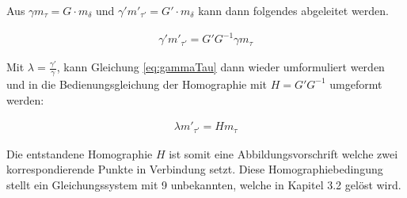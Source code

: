 Aus $\gamma m_\tau = G\cdot m_\delta$ und $\gamma' m'_{\tau'} = G'\cdot m_{\delta}$ kann dann folgendes abgeleitet werden\cite{Elements}.

\begin{gather}
	\gamma' m'_{\tau'} = G' G^{-1} \gamma m_\tau \label{eq:gammaTau}
\end{gather}

Mit $\lambda= \frac{\gamma'}{\gamma}$, kann Gleichung \ref{eq:gammaTau} dann wieder umformuliert werden und in die Bedienungsgleichung der Homographie mit $H=G' G^{-1}$ umgeformt werden:

\begin{gather}
	\lambda m'_{\tau'} = H m_\tau\label{eq:H}
\end{gather} 


Die entstandene Homographie $H$ ist somit eine Abbildungsvorschrift welche zwei korrespondierende Punkte in Verbindung setzt. %
Diese Homographiebedingung stellt ein Gleichungssystem mit 9 unbekannten, welche in Kapitel 3.2 gelöst wird\cite{HZ}.



